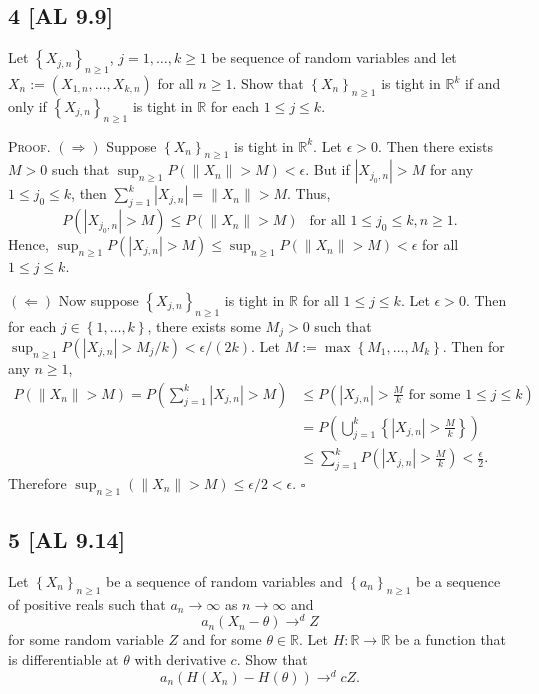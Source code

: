 \documentclass[12pt]{article}
\newcounter{ProofCounter}
\newenvironment{Proof}{\stepcounter{ProofCounter}\textsc{Proof.}}{\hfill$\square$}
\begin{document}
\subsection*{4 [AL 9.9]}
\begin{tcolorbox}
Let $\left\{ X_{j,n} \right\}_{n\geq 1}$, $j = 1, \hdots, k \geq 1$ be sequence of random variables and let $X_{n} := \left( X_{1,n}, \hdots, X_{k,n}
\right)$ for all $n \geq 1$. Show that $\left\{ X_{n} \right\}_{n\geq 1}$ is tight in $\mathbb{R}^{k}$ if and only if $\left\{ X_{j,n} \right\}_{n\geq
1}$ is tight in $\mathbb{R}$ for each $1 \leq j \leq k$.
\end{tcolorbox}
\begin{Proof}
$(\Rightarrow)$ Suppose $\left\{ X_{n} \right\}_{n\geq 1}$ is tight in $\mathbb{R}^{k}$. Let $\epsilon > 0$. Then there exists $M > 0$ such that 
$\sup_{n\geq 1}P(\|X_{n}\| > M) < \epsilon$. But if $|X_{j_0,n}| > M$ for any $1 \leq j_0 \leq k$, then $\sum_{j=1}^{k}|X_{j,n}| = \|X_n\| > M$. Thus,
\[ P\left( |X_{j_0,n}| > M \right) \leq P\left( \|X_{n}\| > M \right) \ \ \text{ for all } 1 \leq j_0 \leq k, n \geq 1. \]
Hence, $\sup_{n\geq 1}P\left( |X_{j,n}| > M \right) \leq \sup_{n\geq 1}P(\|X_n\| > M) < \epsilon$ for all $1 \leq j \leq k$.

$(\Leftarrow)$ Now suppose $\left\{ X_{j,n} \right\}_{n\geq 1}$ is tight in $\mathbb{R}$ for all $1 \leq j \leq k$. Let $\epsilon > 0$. Then for each
$j \in \left\{ 1,\hdots, k \right\}$, there exists some $M_j > 0$ such that $\sup_{n\geq 1}P(|X_{j,n}| > M_j / k) < \epsilon / (2k)$. Let $M :=
\max\left\{ M_{1}, \hdots, M_{k} \right\}$. Then for any $n \geq 1$,
\begin{align*}
P(\|X_n\| > M) = P\left( \sum_{j=1}^{k}|X_{j,n}| > M \right) & \leq P\left( |X_{j,n}| > \frac{M}{k}\text{ for some } 1 \leq j \leq k \right) \\
& = P\left( \bigcup_{j=1}^{k}\left\{ |X_{j,n}| > \frac{M}{k} \right\} \right) \\
& \leq \sum_{j=1}^{k}P\left(|X_{j,n}| > \frac{M}{k}\right) < \frac{\epsilon}{2}.
\end{align*}
Therefore $\sup_{n\geq 1}(\|X_{n}\| > M) \leq \epsilon / 2 < \epsilon$.
\end{Proof}


\newpage
\subsection*{5 [AL 9.14]}
\begin{tcolorbox}
Let $\left\{ X_{n} \right\}_{n\geq 1}$ be a sequence of random variables and $\left\{ a_n \right\}_{n\geq 1}$ be a sequence of positive reals such
that $a_n \rightarrow \infty$ as $n \rightarrow \infty$ and 
\[ a_n(X_n - \theta) \rightarrow^{d} Z \]
for some random variable $Z$ and for some $\theta \in \mathbb{R}$. Let $H : \mathbb{R} \rightarrow \mathbb{R}$ be a function that is differentiable at
$\theta$ with derivative $c$. Show that 
\[ a_n(H(X_n) - H(\theta)) \rightarrow^{d} cZ. \]
\end{tcolorbox}
\end{document}
